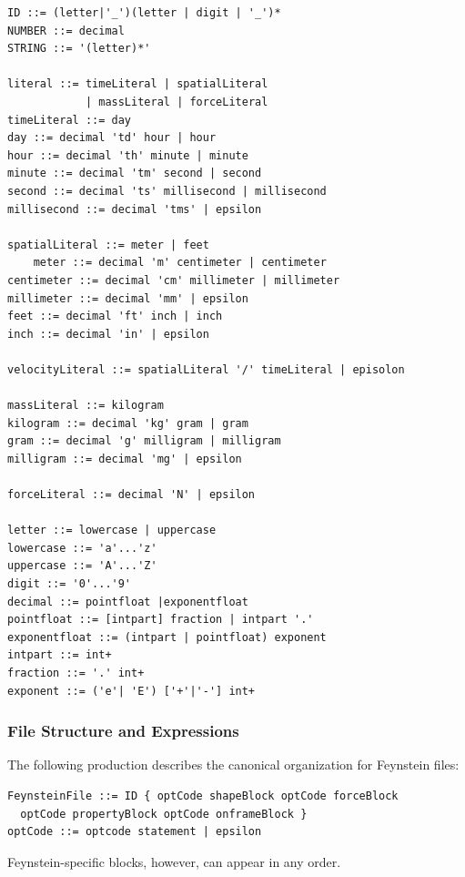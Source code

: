 \begin{verbatim}
ID ::= (letter|'_')(letter | digit | '_')*
NUMBER ::= decimal
STRING ::= '(letter)*'

literal ::= timeLiteral | spatialLiteral 
            | massLiteral | forceLiteral
timeLiteral ::= day
day ::= decimal 'td' hour | hour
hour ::= decimal 'th' minute | minute
minute ::= decimal 'tm' second | second
second ::= decimal 'ts' millisecond | millisecond 
millisecond ::= decimal 'tms' | epsilon

spatialLiteral ::= meter | feet
	meter ::= decimal 'm' centimeter | centimeter
centimeter ::= decimal 'cm' millimeter | millimeter
millimeter ::= decimal 'mm' | epsilon
feet ::= decimal 'ft' inch | inch
inch ::= decimal 'in' | epsilon

velocityLiteral ::= spatialLiteral '/' timeLiteral | episolon

massLiteral ::= kilogram
kilogram ::= decimal 'kg' gram | gram
gram ::= decimal 'g' milligram | milligram
milligram ::= decimal 'mg' | epsilon

forceLiteral ::= decimal 'N' | epsilon

letter ::= lowercase | uppercase
lowercase ::= 'a'...'z'
uppercase ::= 'A'...'Z'
digit ::= '0'...'9'
decimal ::= pointfloat |exponentfloat
pointfloat ::= [intpart] fraction | intpart '.'
exponentfloat ::= (intpart | pointfloat) exponent
intpart ::= int+
fraction ::= '.' int+
exponent ::= ('e'| 'E') ['+'|'‐'] int+
\end{verbatim}

\subsubsection{File Structure and Expressions}

The following production describes the canonical organization for Feynstein files:
\begin{verbatim}
FeynsteinFile ::= ID { optCode shapeBlock optCode forceBlock 
  optCode propertyBlock optCode onframeBlock }
optCode ::= optcode statement | epsilon
\end{verbatim}
Feynstein-specific blocks, however, can appear in any order.

